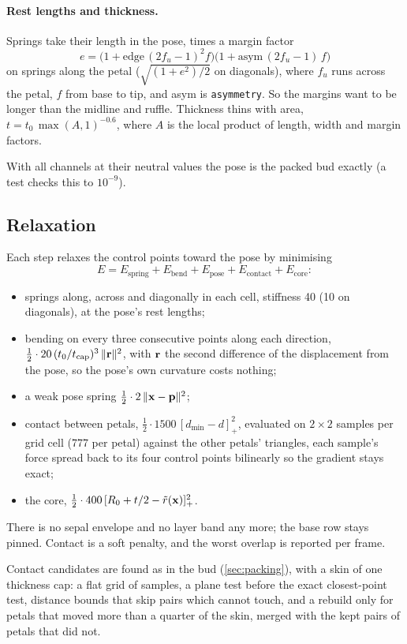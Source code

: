 \paragraph{Rest lengths and thickness.} Springs take their length in the pose,
times a margin factor
\[
  e = \bigl(1 + \text{edge}\,(2f_u-1)^2 f\bigr)\bigl(1 + \text{asym}\,(2f_u-1)\, f\bigr)
\]
on springs along the petal ($\sqrt{(1+e^2)/2}$ on diagonals), where $f_u$ runs
across the petal, $f$ from base to tip, and asym is \texttt{asymmetry}. So the margins want to be longer than the midline and
ruffle. Thickness thins with area, $t = t_0\,\max(A, 1)^{-0.6}$, where $A$ is
the local product of length, width and margin factors.

With all channels at their neutral values the pose is the packed bud exactly
(a test checks this to $10^{-9}$).

\subsection{Relaxation}\label{sec:opening-relax}
Each step relaxes the control points toward the pose by minimising
\[
  E = E_{\mathrm{spring}} + E_{\mathrm{bend}} + E_{\mathrm{pose}} + E_{\mathrm{contact}} + E_{\mathrm{core}}:
\]
\begin{itemize}[leftmargin=*]
\item springs along, across and diagonally in each cell, stiffness 40 (10 on
  diagonals), at the pose's rest lengths;
\item bending on every three consecutive points along each direction,
  $\tfrac12\cdot20\,(t_0/t_{\mathrm{cap}})^3\,\lVert\mathbf{r}\rVert^2$, with
  $\mathbf{r}$ the second difference of the displacement from the pose, so the
  pose's own curvature costs nothing;
\item a weak pose spring $\tfrac12\cdot2\,\lVert\mathbf{x} - \mathbf{p}\rVert^2$;
\item contact between petals, $\tfrac12\cdot1500\,[d_{\min}-d]_+^2$, evaluated on
  $2\times2$ samples per grid cell (777 per petal) against the other petals'
  triangles, each sample's force spread back to its four control points
  bilinearly so the gradient stays exact;
\item the core, $\tfrac12\cdot400\,[R_0 + t/2 - \tilde r(\mathbf{x})]_+^2$.
\end{itemize}
There is no sepal envelope and no layer band any more; the base row stays
pinned. Contact is a soft penalty, and the worst overlap is reported per frame.

Contact candidates are found as in the bud (\cref{sec:packing}), with a skin
of one thickness cap: a flat grid of samples, a plane test before the exact
closest-point test, distance bounds that skip pairs which cannot touch, and a
rebuild only for petals that moved more than a quarter of the skin, merged with
the kept pairs of petals that did not.

